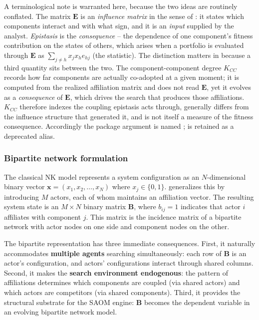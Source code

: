 \documentclass[
  article]{jss}
\begin{document}
A terminological note is warranted here, because the two ideas are
routinely conflated. The matrix \(\mathbf{E}\) is an \emph{influence
matrix} in the sense of \citet{RivkinSiggelkow2007}: it states which
components interact and with what sign, and it is an \emph{input}
supplied by the analyst. \emph{Epistasis} is the \emph{consequence} --
the dependence of one component's fitness contribution on the states of
others, which arises when a portfolio is evaluated through
\(\mathbf{E}\) as \(\sum_{j \neq h} x_j x_h e_{hj}\) (the 
statistic). The distinction matters in  because a third
quantity sits between the two. The component-component degree \(K_{CC}\)
records how far components are actually co-adopted at a given moment; it
is computed from the realized affiliation matrix and does not read
\(\mathbf{E}\), yet it evolves as a \emph{consequence} of
\(\mathbf{E}\), which drives the search that produces those
affiliations. \(K_{CC}\) therefore indexes the coupling epistasis acts
through, generally differs from the influence structure that generated
it, and is not itself a measure of the fitness consequence. Accordingly
the package argument is named ;
 is retained as a deprecated alias.

\subsubsection{Bipartite network formulation}\label{sec:bipartite}

The classical NK model represents a system configuration as an
\(N\)-dimensional binary vector \(\mathbf{x} = (x_1, x_2, \ldots, x_N)\)
where \(x_j \in \{0, 1\}\).  generalizes this by
introducing \(M\) actors, each of whom maintains an affiliation vector.
The resulting system state is an \(M \times N\) binary matrix
\(\mathbf{B}\), where \(b_{ij} = 1\) indicates that actor \(i\)
affiliates with component \(j\). This matrix is the incidence matrix of
a bipartite network with actor nodes on one side and component nodes on
the other.

The bipartite representation has three immediate consequences. First, it
naturally accommodates \textbf{multiple agents} searching
simultaneously: each row of \(\mathbf{B}\) is an actor's configuration,
and actors' configurations interact through shared columns. Second, it
makes the \textbf{search environment endogenous}: the pattern of
affiliations determines which components are coupled (via shared actors)
and which actors are competitors (via shared components). Third, it
provides the structural substrate for the SAOM engine: \(\mathbf{B}\)
becomes the dependent variable in an evolving bipartite network model.
\end{document}
